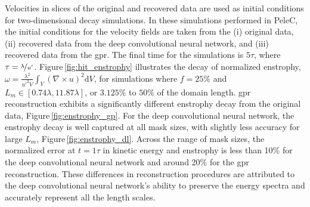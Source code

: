 \documentclass[review]{elsarticle}
\begin{document}
Velocities in slices of the original and recovered data are used as
initial conditions for two-dimensional decay simulations. In these
simulations performed in PeleC, the initial conditions for the
velocity fields are taken from the (i) original data, (ii)
recovered data from the deep convolutional neural network, and (iii)
recovered data from the \gls{gpr}. The final time for the simulations
is $5\tau$, where $\tau =
\nicefrac{\lambda}{u'}$. Figure\,\ref{fig:hit_enstrophy} illustrates
the decay of normalized enstrophy,
$\omega = \frac{\lambda^2}{u'^2 V}\int_V \left( \nabla \times u
\right)^2 \mathrm{d}V$, for simulations where $f=25\%$ and
$L_m \in [0.74\lambda, 11.87\lambda]$, or $3.125\%$ to $50\%$ of the
domain length. \gls{gpr} reconstruction exhibits a significantly
different enstrophy decay from the original data,
Figure\,\ref{fig:enstrophy_gp}. For the deep convolutional neural
network, the enstrophy decay is well captured at all mask sizes, with
slightly less accuracy for large $L_m$,
Figure\,\ref{fig:enstrophy_dl}. Across the range of mask sizes, the
normalized error at $t=1\tau$ in kinetic energy and enstrophy is less than
10\% for the deep convolutional neural network and around 20\% for the
\gls{gpr} reconstruction. These differences in reconstruction
procedures are attributed to the deep convolutional neural network's
ability to preserve the energy spectra and accurately represent all
the length scales.
\end{document}
